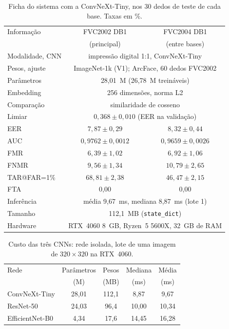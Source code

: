 \documentclass[conference]{IEEEtran}
\begin{document}
\begin{table}[t]
\centering
\caption{Ficha do sistema com a ConvNeXt-Tiny, nos 30 dedos de teste de cada base. Taxas em \%.}
\label{tab:padrao}
\footnotesize
\setlength{\tabcolsep}{3pt}
\begin{tabular}{@{}lcc@{}}
\toprule
Informação & FVC2002 DB1 & FVC2004 DB1 \\
 & (principal) & (entre bases) \\
\midrule
Modalidade, CNN & \multicolumn{2}{c}{impressão digital 1:1, ConvNeXt-Tiny} \\
Pesos, ajuste & \multicolumn{2}{c}{ImageNet-1k (V1); ArcFace, 60 dedos FVC2002} \\
Parâmetros & \multicolumn{2}{c}{28,01~M (26,78~M treináveis)} \\
Embedding & \multicolumn{2}{c}{256 dimensões, norma L2} \\
Comparação & \multicolumn{2}{c}{similaridade de cosseno} \\
Limiar & \multicolumn{2}{c}{$0{,}368\pm0{,}010$ (EER na validação)} \\
\midrule
EER & $7{,}87\pm0{,}29$ & $8{,}32\pm0{,}44$ \\
AUC & $0{,}9762\pm0{,}0012$ & $0{,}9659\pm0{,}0026$ \\
FMR & $6{,}39\pm1{,}02$ & $6{,}92\pm1{,}06$ \\
FNMR & $9{,}56\pm1{,}34$ & $10{,}79\pm2{,}65$ \\
TAR@FAR=1\% & $68{,}81\pm2{,}38$ & $46{,}47\pm2{,}15$ \\
FTA & 0,00 & 0,00 \\
\midrule
Inferência & \multicolumn{2}{c}{média 9,67~ms, mediana 8,87~ms (lote 1)} \\
Tamanho & \multicolumn{2}{c}{112,1~MB (\texttt{state\_dict})} \\
Hardware & \multicolumn{2}{c}{RTX~4060 8~GB, Ryzen~5 5600X, 32~GB de RAM} \\
\bottomrule
\end{tabular}
\end{table}

\begin{table}[t]
\centering
\caption{Custo das três CNNs: rede isolada, lote de uma imagem de $320\times320$ na RTX~4060.}
\label{tab:custo}
\footnotesize
\setlength{\tabcolsep}{3pt}
\begin{tabular}{@{}lcccc@{}}
\toprule
Rede & Parâmetros & Pesos & Mediana & Média \\
 & (M) & (MB) & (ms) & (ms) \\
\midrule
ConvNeXt-Tiny & 28,01 & 112,1 & 8,87 & 9,67 \\
ResNet-50 & 24,03 & 96,4 & 10,00 & 10,34 \\
EfficientNet-B0 & 4,34 & 17,6 & 14,45 & 16,28 \\
\bottomrule
\end{tabular}
\end{table}
\end{document}
